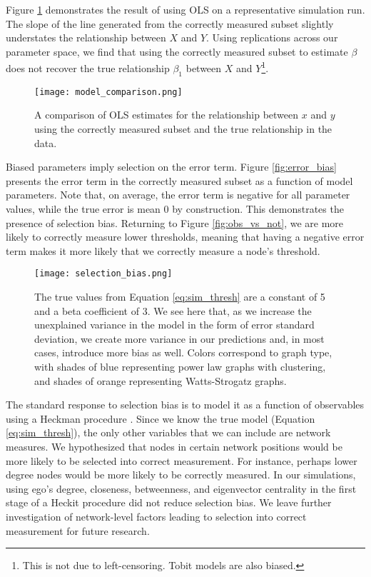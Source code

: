 \documentclass[a4paper]{article}
\begin{document}
Figure \ref{fig:model_comparison} demonstrates the result of using OLS on a representative simulation run. The slope of the line generated from the correctly measured subset slightly understates the relationship between $X$ and $Y$. Using replications across our parameter space, we find that using the correctly measured subset to estimate $\beta$ does not recover the true relationship $\beta_1$ between $X$ and $Y$\footnote{This is not due to left-censoring. Tobit models are also biased.}.

\begin{figure}[h]
\label{fig:model_comparison}
\texttt{[image: model\_comparison.png]}
\caption{A comparison of OLS estimates for the relationship between $x$ and $y$ using the correctly measured subset and the true relationship in the data.}
\end{figure}

Biased parameters imply selection on the error term. Figure \ref{fig:error_bias} presents the error term in the correctly measured subset as a function of model parameters. Note that, on average, the error term is negative for all parameter values, while the true error is mean 0 by construction. This demonstrates the presence of selection bias. Returning to Figure \ref{fig:obs_vs_not}, we are more likely to correctly measure lower thresholds, meaning that having a negative error term makes it more likely that we correctly measure a node's threshold.

\begin{figure}[h]
\label{fig:selection_bias}
\texttt{[image: selection\_bias.png]}
\caption{The true values from Equation \ref{eq:sim_thresh} are a constant of 5 and a beta coefficient of 3. We see here that, as we increase the unexplained variance in the model in the form of error standard deviation, we create more variance in our predictions and, in most cases, introduce more bias as well. Colors correspond to graph type, with shades of blue representing power law graphs with clustering, and shades of orange representing Watts-Strogatz graphs.}
\end{figure}

The standard response to selection bias is to model it as a function of observables using a Heckman procedure \cite{}. Since we know the true model (Equation \ref{eq:sim_thresh}), the only other variables that we can include are network measures. We hypothesized that nodes in certain network positions would be more likely to be selected into correct measurement. For instance, perhaps lower degree nodes would be more likely to be correctly measured. In our simulations, using ego's degree, closeness, betweenness, and eigenvector centrality in the first stage of a Heckit procedure did not reduce selection bias. We leave further investigation of network-level factors leading to selection into correct measurement for future research.
\end{document}
